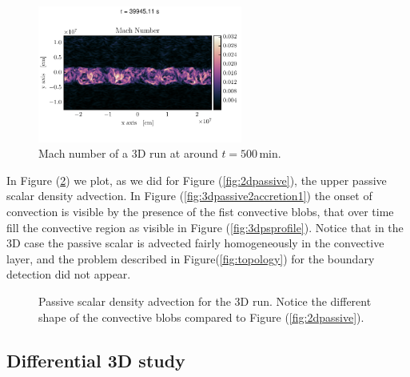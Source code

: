 \begin{figure}[t!]
\centering
\includegraphics[width=0.6\textwidth]{./img/3dmach.pdf}
\caption{Mach number of a 3D run at around $t=500 \, \mathrm{min}$.}
\label{fig:3dmach}
\end{figure}

In Figure (\ref{fig:3dpassive}) we plot, as we did for Figure (\ref{fig:2dpassive}), the upper passive scalar density advection. In Figure (\ref{fig:3dpassive2accretion1}) the onset of convection is visible by the presence of the fist convective blobs, that over time fill the convective region as visible in Figure (\ref{fig:3dpsprofile}). Notice that in the 3D case the passive scalar is advected fairly homogeneously in the convective layer, and the problem described in Figure(\ref{fig:topology}) for the boundary detection did not appear.

\begin{figure}[t!]
      \centering
     \centering
	\hfill
	\caption{Passive scalar density advection for the 3D run. Notice the different shape of the convective blobs compared to Figure (\ref{fig:2dpassive}).}
	\label{fig:3dpassive}
\end{figure}
\subsection{Differential 3D study}
